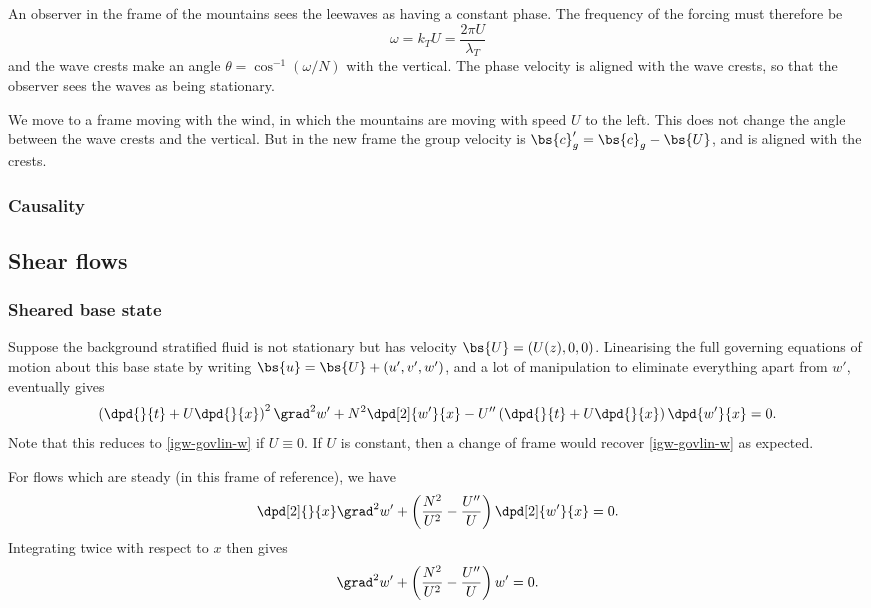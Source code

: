 An observer in the frame of the mountains sees the leewaves as having a constant phase. The frequency of the forcing must therefore be
\begin{equation}
	\omega = k_T U = \frac{2\pi U}{\lambda_T}
\end{equation}
and the wave crests make an angle $\theta = \cos^{-1} (\omega/N)$ with the vertical. The phase velocity is aligned with the wave crests, so that the observer sees the waves as being stationary.

We move to a frame moving with the wind, in which the mountains are moving with speed $U$ to the left. This does not change the angle between the wave crests and the vertical. But in the new frame the group velocity is $\bs{c}'_g = \bs{c}_g - \bs{U}$, and is aligned with the crests. 

\subsubsection{Causality}

\subsection{Shear flows}

\subsubsection{Sheared base state}

Suppose the background stratified fluid is not stationary but has velocity $\bs{U} = (U(z),0,0)$. Linearising the full governing equations of motion about this base state by writing $\bs{u} = \bs{U} + (u',v',w')$, and a lot of manipulation to eliminate everything apart from $w'$, eventually gives
\begin{equation}
	\left(\dpd{}{t} + U\dpd{}{x}\right)^2 \grad^2 w' + N^2 \dpd[2]{w'}{x} - U''\left(\dpd{}{t} + U\dpd{}{x}\right)\dpd{w'}{x} = 0.
\end{equation}
Note that this reduces to \ref{igw-govlin-w} if $U\equiv0$. If $U$ is constant, then a change of frame would recover \ref{igw-govlin-w} as expected.

For flows which are steady (in this frame of reference), we have
\begin{equation}
	\dpd[2]{}{x} \grad^2 w' + \left( \frac{N^2}{U^2} - \frac{U''}{U} \right)\dpd[2]{w'}{x} = 0.
\end{equation}
Integrating twice with respect to $x$ then gives
\begin{equation}
	\grad^2 w' + \left( \frac{N^2}{U^2} - \frac{U''}{U} \right) w' = 0.
\end{equation}

